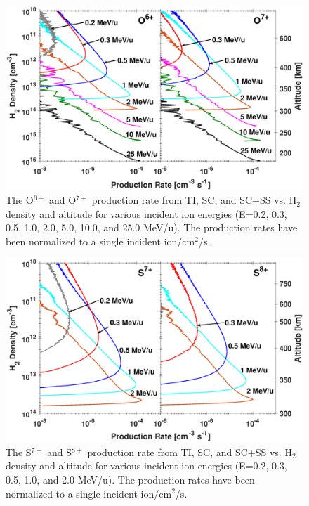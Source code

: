 \documentclass[draft]{agujournal2018}
\begin{document}
\begin{figure}[ht]
    \centering
    \includegraphics[width=\textwidth]{Figures/O6O7CXProd2x2.eps}
    \caption{The O$^{6+}$ and O$^{7+}$ production rate from TI, SC, and SC+SS vs. H$_2$ density and altitude for various incident ion energies (E=0.2, 0.3, 0.5, 1.0, 2.0, 5.0, 10.0, and 25.0 MeV/u). The production rates have been normalized to a single incident ion/cm$^2$/s.}
    \label{fig:O6O7+Prod}
\end{figure}

\begin{figure}[ht]
    \centering
    \includegraphics[width=\textwidth]{Figures/S7S8CXProd2x2.eps}
    \caption{The S$^{7+}$ and S$^{8+}$ production rate from TI, SC, and SC+SS vs. H$_2$ density and altitude for various incident ion energies (E=0.2, 0.3, 0.5, 1.0, and 2.0 MeV/u). The production rates have been normalized to a single incident ion/cm$^2$/s.}
    \label{fig:S7S8+Prod}
\end{figure}
\end{document}
